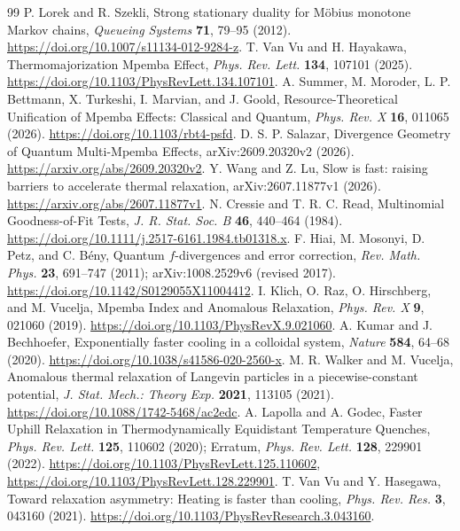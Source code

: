 \documentclass[11pt,a4paper]{article}
\theoremstyle{remark}\newtheorem{remark}[theorem]{Remark}
\begin{document}
\begin{thebibliography}{99}
P. Lorek and R. Szekli, Strong stationary duality for M\"obius monotone Markov chains, \emph{Queueing Systems} \textbf{71}, 79--95 (2012). \url{https://doi.org/10.1007/s11134-012-9284-z}.
T. Van Vu and H. Hayakawa, Thermomajorization Mpemba Effect, \emph{Phys. Rev. Lett.} \textbf{134}, 107101 (2025). \url{https://doi.org/10.1103/PhysRevLett.134.107101}.
A. Summer, M. Moroder, L. P. Bettmann, X. Turkeshi, I. Marvian, and J. Goold, Resource-Theoretical Unification of Mpemba Effects: Classical and Quantum, \emph{Phys. Rev. X} \textbf{16}, 011065 (2026). \url{https://doi.org/10.1103/rbt4-psfd}.
D. S. P. Salazar, Divergence Geometry of Quantum Multi-Mpemba Effects, arXiv:2609.20320v2 (2026). \url{https://arxiv.org/abs/2609.20320v2}.
Y. Wang and Z. Lu, Slow is fast: raising barriers to accelerate thermal relaxation, arXiv:2607.11877v1 (2026). \url{https://arxiv.org/abs/2607.11877v1}.
N. Cressie and T. R. C. Read, Multinomial Goodness-of-Fit Tests, \emph{J. R. Stat. Soc. B} \textbf{46}, 440--464 (1984). \url{https://doi.org/10.1111/j.2517-6161.1984.tb01318.x}.
F. Hiai, M. Mosonyi, D. Petz, and C. B\'eny, Quantum $f$-divergences and error correction, \emph{Rev. Math. Phys.} \textbf{23}, 691--747 (2011); arXiv:1008.2529v6 (revised 2017). \url{https://doi.org/10.1142/S0129055X11004412}.
I. Klich, O. Raz, O. Hirschberg, and M. Vucelja, Mpemba Index and Anomalous Relaxation, \emph{Phys. Rev. X} \textbf{9}, 021060 (2019). \url{https://doi.org/10.1103/PhysRevX.9.021060}.
A. Kumar and J. Bechhoefer, Exponentially faster cooling in a colloidal system, \emph{Nature} \textbf{584}, 64--68 (2020). \url{https://doi.org/10.1038/s41586-020-2560-x}.
M. R. Walker and M. Vucelja, Anomalous thermal relaxation of Langevin particles in a piecewise-constant potential, \emph{J. Stat. Mech.: Theory Exp.} \textbf{2021}, 113105 (2021). \url{https://doi.org/10.1088/1742-5468/ac2edc}.
A. Lapolla and A. Godec, Faster Uphill Relaxation in Thermodynamically Equidistant Temperature Quenches, \emph{Phys. Rev. Lett.} \textbf{125}, 110602 (2020); Erratum, \emph{Phys. Rev. Lett.} \textbf{128}, 229901 (2022). \url{https://doi.org/10.1103/PhysRevLett.125.110602}, \url{https://doi.org/10.1103/PhysRevLett.128.229901}.
T. Van Vu and Y. Hasegawa, Toward relaxation asymmetry: Heating is faster than cooling, \emph{Phys. Rev. Res.} \textbf{3}, 043160 (2021). \url{https://doi.org/10.1103/PhysRevResearch.3.043160}.

\end{thebibliography}
\end{document}
